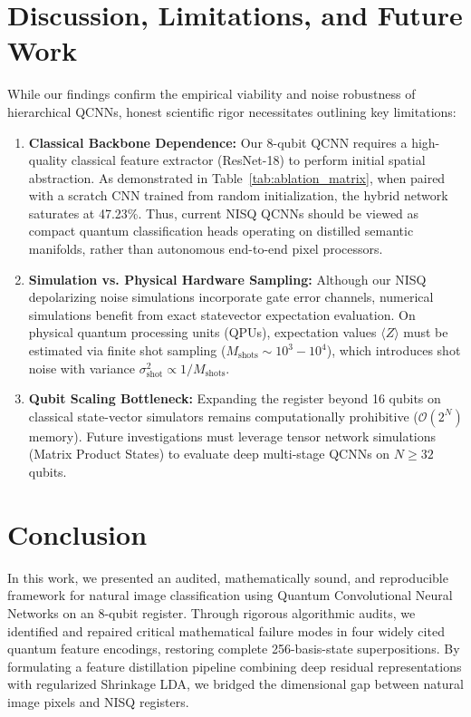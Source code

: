 \documentclass[10pt,twocolumn,twoside,a4paper]{article}
\begin{document}
\section{Discussion, Limitations, and Future Work}
\label{sec:discussion}

While our findings confirm the empirical viability and noise robustness of hierarchical QCNNs, honest scientific rigor necessitates outlining key limitations:
\begin{enumerate}
    \item \textbf{Classical Backbone Dependence:} Our 8-qubit QCNN requires a high-quality classical feature extractor (ResNet-18) to perform initial spatial abstraction. As demonstrated in Table~\ref{tab:ablation_matrix}, when paired with a scratch CNN trained from random initialization, the hybrid network saturates at 47.23\%. Thus, current NISQ QCNNs should be viewed as compact quantum classification heads operating on distilled semantic manifolds, rather than autonomous end-to-end pixel processors.
    \item \textbf{Simulation vs. Physical Hardware Sampling:} Although our NISQ depolarizing noise simulations incorporate gate error channels, numerical simulations benefit from exact statevector expectation evaluation. On physical quantum processing units (QPUs), expectation values $\langle Z \rangle$ must be estimated via finite shot sampling ($M_{\text{shots}} \sim 10^3 - 10^4$), which introduces shot noise with variance $\sigma_{\text{shot}}^2 \propto 1 / M_{\text{shots}}$.
    \item \textbf{Qubit Scaling Bottleneck:} Expanding the register beyond 16 qubits on classical state-vector simulators remains computationally prohibitive ($\mathcal{O}(2^N)$ memory). Future investigations must leverage tensor network simulations (Matrix Product States) to evaluate deep multi-stage QCNNs on $N \ge 32$ qubits.
\end{enumerate}

\section{Conclusion}
\label{sec:conclusion}

In this work, we presented an audited, mathematically sound, and reproducible framework for natural image classification using Quantum Convolutional Neural Networks on an 8-qubit register. Through rigorous algorithmic audits, we identified and repaired critical mathematical failure modes in four widely cited quantum feature encodings, restoring complete 256-basis-state superpositions. By formulating a feature distillation pipeline combining deep residual representations with regularized Shrinkage LDA, we bridged the dimensional gap between natural image pixels and NISQ registers.
\end{document}
